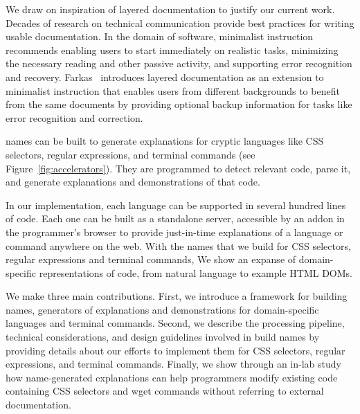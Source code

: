 We draw on inspiration of layered documentation to justify our current work. 
Decades of research on technical communication provide best practices for writing usable documentation.
In the domain of software, minimalist instruction~\cite{carroll_nurnberg_1990} recommends enabling users to start immediately on realistic tasks, minimizing the necessary  reading and other passive activity, and supporting error recognition and recovery.
Farkas~\cite{farkas_layering_1998} introduces layered documentation as an extension to minimalist instruction that enables users from different backgrounds to benefit from the same documents by providing optional backup information for tasks like error recognition and correction.
\fi 
%
\begin{changes}
\Glspl{name} can be built to generate explanations for cryptic languages like CSS selectors, regular expressions, and terminal commands (see Figure~\ref{fig:accelerators}). 
They are programmed to detect relevant code, parse it, and generate explanations and demonstrations of that code. 
\end{changes}
In our implementation, each language can be supported in several hundred lines of code.
Each one can be built as a standalone server, accessible by an addon in the programmer's browser to provide just-in-time explanations of a language or command anywhere on the web.
 With the \glspl{name} that we build for CSS selectors, regular expressions and terminal commands, \fi We show an expanse of domain-specific representations of code, from natural language to example HTML DOMs. 

We make three main contributions.
First, we introduce a framework for building \Glspl{name}, generators of explanations and demonstrations for domain-specific languages and terminal commands.
Second, we describe the processing pipeline, technical considerations, and design guidelines involved in build \glspl{name} by providing details about our efforts to implement them for CSS selectors, regular expressions, and terminal commands. 
Finally, we show through an in-lab study how \gls{name}-generated explanations can help programmers modify existing code containing CSS selectors and wget commands without referring to external documentation. 
